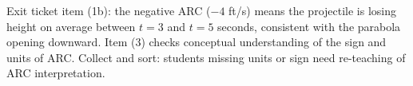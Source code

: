 \documentclass[10pt]{article}
\begin{document}
\begin{teachernote}
Exit ticket item (1b): the negative ARC ($-4$ ft/s) means the projectile is losing height on
average between $t=3$ and $t=5$ seconds, consistent with the parabola opening downward.
Item (3) checks conceptual understanding of the sign and units of ARC.
Collect and sort: students missing units or sign need re-teaching of ARC interpretation.
\end{teachernote}
\end{document}
